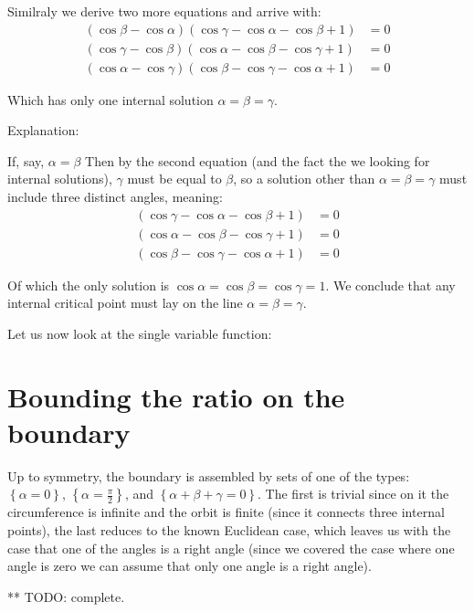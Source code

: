 \documentclass[a4paper,10pt]{article}
\begin{document}
Similraly we derive two more equations and arrive with:
\begin{align*}
\left(\cos{\beta} - \cos{\alpha}\right)\left(\cos{\gamma} - \cos{\alpha} - \cos{\beta} + 1\right) &=0\\
\left(\cos{\gamma} - \cos{\beta}\right)\left(\cos{\alpha} - \cos{\beta} - \cos{\gamma} + 1\right) &=0\\
\left(\cos{\alpha} - \cos{\gamma}\right)\left(\cos{\beta} - \cos{\gamma} - \cos{\alpha} + 1\right) &=0
\end{align*}

Which has only one internal solution $\alpha=\beta=\gamma$.

Explanation:

If, say, $\alpha=\beta$ Then by the second equation (and the fact the we looking for internal solutions), $\gamma$ must
be equal to $\beta$, so a solution other than $\alpha=\beta=\gamma$ must include three distinct angles, meaning:
\begin{align*}
\left(\cos{\gamma} - \cos{\alpha} - \cos{\beta} + 1\right) &=0\\
\left(\cos{\alpha} - \cos{\beta} - \cos{\gamma} + 1\right) &=0\\
\left(\cos{\beta} - \cos{\gamma} - \cos{\alpha} + 1\right) &=0
\end{align*}

Of which the only solution is $\cos{\alpha}=\cos{\beta}=\cos{\gamma}=1$.
We conclude that any internal critical point must lay on the line $\alpha=\beta=\gamma$.

Let us now look at the single variable function:


\section{Bounding the ratio on the boundary}

Up to symmetry, the boundary is assembled by sets of one of the types: 
$\left\{\alpha=0\right\}$, $\left\{\alpha=\frac{\pi}{2}\right\}$, and
$\left\{\alpha+\beta+\gamma=0\right\}$. The first is trivial since on it the
circumference is infinite and the orbit is finite (since it connects
three internal points), the last reduces to the known Euclidean case,
which leaves us with the case that one of the angles is a right
angle (since we covered the case where one angle is zero we can assume
that only one angle is a right angle).

** TODO: complete.
\end{document}
